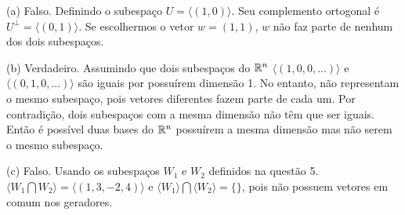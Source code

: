 \documentclass{homework}
\begin{document}
\exercise*

(a) Falso. Definindo o subespaço $U = \langle(1,0)\rangle$. Seu complemento ortogonal é $U^\perp = \langle(0,1)\rangle$. Se escolhermos o vetor $w = (1,1)$, $w$ não faz parte de nenhum dos dois subespaços. 

(b) Verdadeiro. Assumindo que dois subespaços do $\mathbb R^n$ $\langle(1,0,0,...)\rangle$ e $\langle(0,1,0,...)\rangle$ são iguais por possuírem dimensão 1. No entanto, não representam o mesmo subespaço, pois vetores diferentes fazem parte de cada um. Por contradição, dois subespaços com a mesma dimensão não têm que ser iguais. Então é possível duas bases do $\mathbb R^n$ possuírem a mesma dimensão mas não serem o mesmo subespaço.

(c) Falso. Usando os subespaços $W_1$ e $W_2$ definidos na questão 5. $\langle W_1 \bigcap W_2 \rangle = \langle(1,3,-2,4)\rangle$ e $\langle W_1 \rangle \bigcap \langle W_2 \rangle = \{\}$, pois não possuem vetores em comum nos geradores.
\end{document}
